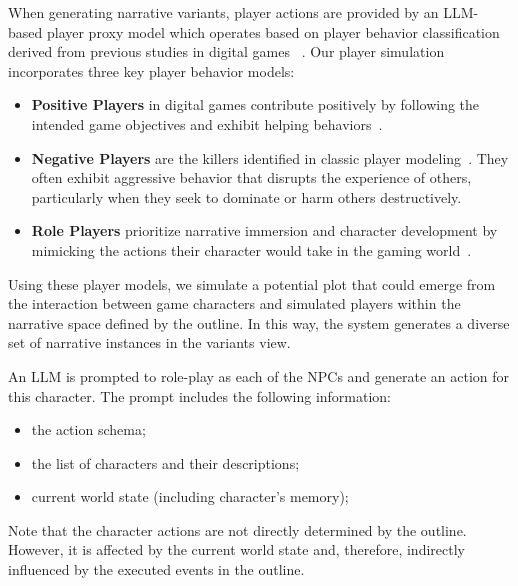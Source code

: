 
\vspace{2mm}\noindent {} \hspace{2mm} %
When generating narrative variants, player actions are provided by an LLM-based player proxy model which operates based on player behavior classification derived from previous studies in digital games ~\cite{yannakakis2013player,worth2015dimensions}. Our player simulation incorporates three key player behavior models:

\begin{itemize}
    \item \textbf{Positive Players} in digital games contribute positively by following the intended game objectives and exhibit helping behaviors~\cite{velez2013helping,bostan2009player}.
    \item \textbf{Negative Players} are the killers identified in classic player modeling~\cite{majors2021some,hamari2014player}. They often exhibit aggressive behavior that disrupts the experience of others, particularly when they seek to dominate or harm others destructively.
    \item \textbf{Role Players} prioritize narrative immersion and character development by mimicking the actions their character would take in the gaming world~\cite{praetorius2020avatars}.    
\end{itemize}

Using these player models, we simulate a potential plot that could emerge from the interaction between game characters and simulated players within the narrative space defined by the outline. In this way, the system generates a diverse set of narrative instances in the variants view.

\vspace{2mm} \noindent {} \hspace{2mm} 
An LLM is prompted to role-play as each of the NPCs and generate an action for this character. The prompt includes the following information:
\begin{itemize}
   \item the action schema;
   \item the list of characters and their descriptions;
   \item current world state (including character's memory);
\end{itemize}
Note that the character actions are not directly determined by the outline. However, it is affected by the current world state and, therefore, indirectly influenced by the executed events in the outline.

